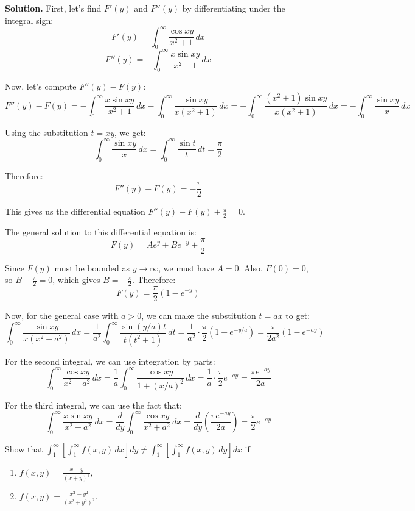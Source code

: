 \noindent\textbf{Solution.}
First, let's find $F'(y)$ and $F''(y)$ by differentiating under the integral sign:
\[F'(y) = \int_{0}^{\infty} \frac{\cos xy}{x^2 + 1} \, dx\]
\[F''(y) = -\int_{0}^{\infty} \frac{x \sin xy}{x^2 + 1} \, dx\]

Now, let's compute $F''(y) - F(y)$:
\[F''(y) - F(y) = -\int_{0}^{\infty} \frac{x \sin xy}{x^2 + 1} \, dx - \int_{0}^{\infty} \frac{\sin xy}{x(x^2 + 1)} \, dx = -\int_{0}^{\infty} \frac{(x^2 + 1) \sin xy}{x(x^2 + 1)} \, dx = -\int_{0}^{\infty} \frac{\sin xy}{x} \, dx\]

Using the substitution $t = xy$, we get:
\[\int_{0}^{\infty} \frac{\sin xy}{x} \, dx = \int_{0}^{\infty} \frac{\sin t}{t} \, dt = \frac{\pi}{2}\]

Therefore:
\[F''(y) - F(y) = -\frac{\pi}{2}\]

This gives us the differential equation $F''(y) - F(y) + \frac{\pi}{2} = 0$.

The general solution to this differential equation is:
\[F(y) = A e^y + B e^{-y} + \frac{\pi}{2}\]

Since $F(y)$ must be bounded as $y \to \infty$, we must have $A = 0$. Also, $F(0) = 0$, so $B + \frac{\pi}{2} = 0$, which gives $B = -\frac{\pi}{2}$. Therefore:
\[F(y) = \frac{\pi}{2} (1 - e^{-y})\]

Now, for the general case with $a > 0$, we can make the substitution $t = ax$ to get:
\[\int_{0}^{\infty} \frac{\sin xy}{x(x^2 + a^2)} \, dx = \frac{1}{a^2} \int_{0}^{\infty} \frac{\sin (y/a)t}{t(t^2 + 1)} \, dt = \frac{1}{a^2} \cdot \frac{\pi}{2} (1 - e^{-y/a}) = \frac{\pi}{2a^2} (1 - e^{-ay})\]

For the second integral, we can use integration by parts:
\[\int_{0}^{\infty} \frac{\cos xy}{x^2 + a^2} \, dx = \frac{1}{a} \int_{0}^{\infty} \frac{\cos xy}{1 + (x/a)^2} \, dx = \frac{1}{a} \cdot \frac{\pi}{2} e^{-ay} = \frac{\pi e^{-ay}}{2a}\]

For the third integral, we can use the fact that:
\[\int_{0}^{\infty} \frac{x \sin xy}{x^2 + a^2} \, dx = \frac{d}{dy} \int_{0}^{\infty} \frac{\cos xy}{x^2 + a^2} \, dx = \frac{d}{dy} \left(\frac{\pi e^{-ay}}{2a}\right) = \frac{\pi}{2} e^{-ay}\]

\begin{problembox}
Show that $\int_{1}^{\infty} \left[ \int_{1}^{\infty} f(x, y) \, dx \right] dy \neq \int_{1}^{\infty} \left[ \int_{1}^{\infty} f(x, y) \, dy \right] dx$ if
\begin{enumerate}[label=(\alph*)]
    \item $f(x, y) = \frac{x - y}{(x + y)^3}$,
    \item $f(x, y) = \frac{x^2 - y^2}{(x^2 + y^2)^2}.$
\end{enumerate}
\end{problembox}

